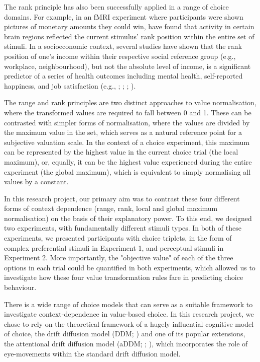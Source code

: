 \documentclass[11pt,a4paper]{article}
\begin{document}

The rank principle has also been successfully applied in a range of choice domains. For example, in an fMRI experiment where participants were shown pictures of monetary amounts they could win,  have found that activity in certain brain regions reflected the current stimulus' rank position within the entire set of stimuli. In a socioeconomic context, several studies have shown that the rank position of one's income within their respective social reference group (e.g., workplace, neighbourhood), but not the absolute level of income, is a significant predictor of a series of health outcomes including mental health, self-reported happiness, and job satisfaction (e.g., ; ; ; ).

The range and rank principles are two distinct approaches to value normalisation, where the transformed values are required to fall between 0 and 1. These can be contrasted with simpler forms of normalisation, where the values are divided by the maximum value in the set, which serves as a natural reference point for a subjective valuation scale. In the context of a choice experiment, this maximum can be represented by the highest value in the current choice trial (the local maximum), or, equally, it can be the highest value experienced during the entire experiment (the global maximum), which is equivalent to simply normalising all values by a constant.

In this research project, our primary aim was to contrast these four different forms of context dependence (range, rank, local and global maximum normalisation) on the basis of their explanatory power. To this end, we designed two experiments, with fundamentally different stimuli types. In both of these experiments, we presented participants with choice triplets, in the form of complex preferential stimuli in Experiment 1, and perceptual stimuli in Experiment 2. More importantly, the "objective value" of each of the three options in each trial could be quantified in both experiments, which allowed us to investigate how these four value transformation rules fare in predicting choice behaviour.

There is a wide range of choice models that can serve as a suitable framework to investigate context-dependence in value-based choice. In this research project, we chose to rely on the theoretical framework of a hugely influential cognitive model of choice, the drift diffusion model (DDM; ) and one of its popular extensions, the attentional drift diffusion model (aDDM; ; ), which incorporates the role of eye-movements within the standard drift diffusion model. 
\end{document}
